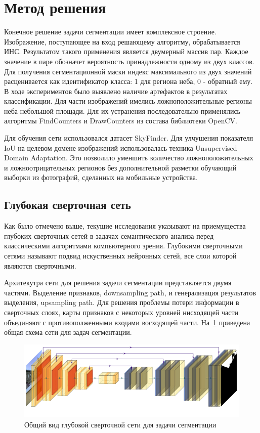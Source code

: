 \section{Метод решения}

Конечное решение задачи сегментации имеет комплексное строение.
Изображение, поступающее на вход решающему алгоритму, обрабатывается ИНС.
Результатом такого применения является двумерный массив пар.
Каждое значение в паре обозначет вероятность принадлежности одному из двух классов.
Для получения сегментационной маски индекс максимального из двух значений расценивается как идентификатор класса: 1 для региона неба, 0 - обратный ему.
В ходе экспериментов было выявлено наличие артефактов в результатах классификации.
Для части изображений имелись ложноположительные регионы неба небольшой площади.
Для их устранения последовательно применялись алгоритмы FindCounters и DrawCounters из состава библиотеки OpenCV.

Для обучения сети использовался датасет SkyFinder.
Для улчушения показателя IoU на целевом домене изображений использовалась техника Unsupervised Domain Adaptation.
Это позволило уменшить количество ложноположительных и ложноотрицательных регионов без дополнительной разметки обучающий выборки из фотографий,
сделанных на мобильные устройства.

\subsection{Глубокая сверточная сеть}

Как было отмечено выше, текущие исследования указывают на приемущества глубоких сверточных сетей в задачах семантического анализа
перед классическими алгоритмами компьютерного зрения.
Глубокими сверточными сетями называют подвид искуственных нейронных сетей, все слои которой являются сверточными.

Архитекутра сети для решения задачи сегментации представляется двумя частями.
Выделение признаков, downsampling path, и генерализация результатов выделения, upsampling path.
Для решения проблемы потери информации в сверточных слоях, карты признаков с некоторых уровней нисходящей части объединяют с противополженными входами восходящей части.
На~\ref{fig:net_arch_common} приведена общая схема сети для задач сегментации.

\begin{figure}[H]
    \centering
    \includegraphics[width=\textwidth]{img/net_arch.png}
    \caption{Общий вид глубокой сверточной сети для задачи сегментации}
    \label{fig:net_arch_common}
\end{figure}

